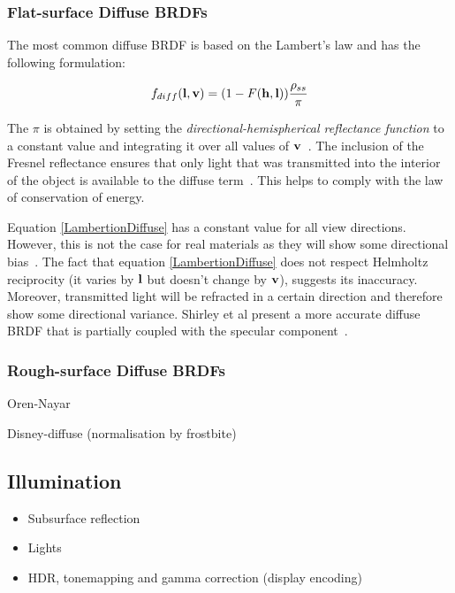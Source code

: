 \subsubsection{Flat-surface Diffuse BRDFs}

The most common diffuse BRDF is based on the Lambert's law and has the following formulation:

\begin{equation} \label{LambertionDiffuse}
	f_{diff}(\mathbf{l}, \mathbf{v}) = (1 - F(\mathbf{h}, \mathbf{l}))\frac{\rho_{ss}}{\pi}
\end{equation}

The \begin{math}\pi\end{math} is obtained by setting the \textit{directional-hemispherical reflectance function} to a constant value and integrating it over all values of \begin{math}\mathbf{v}\end{math}~\cite{RTR4}. The inclusion of the Fresnel reflectance ensures that only light that was transmitted into the interior of the object is available to the diffuse term~\cite{ShirleySimpleConservationOfEnergy}. This helps to comply with the law of conservation of energy.

Equation \ref{LambertionDiffuse} has a constant value for all view directions. However, this is not the case for real materials as they will show some directional bias~\cite{RTR4}. The fact that equation \ref{LambertionDiffuse} does not respect Helmholtz reciprocity (it varies by \begin{math}\mathbf{l}\end{math} but doesn't change by \begin{math}\mathbf{v}\end{math}), suggests its inaccuracy. Moreover, transmitted light will be refracted in a certain direction and therefore show some directional variance. Shirley et al present a more accurate diffuse BRDF that is partially coupled with the specular component~\cite{PractitionersReflectionModels}.

\subsubsection{Rough-surface Diffuse BRDFs}

Oren-Nayar

Disney-diffuse (normalisation by frostbite)

\subsection{Illumination} \label{Illumination}

\begin{itemize}
	\item Subsurface reflection
	\item Lights
	\item HDR, tonemapping and gamma correction (display encoding)
\end{itemize}

